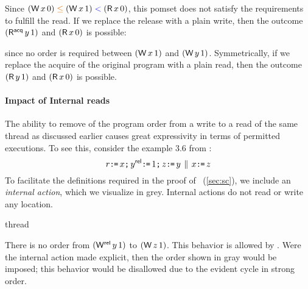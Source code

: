 \smallskip
\noindent
Since $(\DW x0) \gtN (\DW x1) \lt (\DR x0)$, this pomset does not satisfy the
requirements to fulfill the read.
If we replace the release
with a plain write, then the outcome $(\DRAcq y1)$ and $(\DR x0)$ is possible:
\begin{tikzdisplay}[node distance=1em]
\end{tikzdisplay}
since no order is required between $(\DW x1)$ and $(\DW y1)$.  
Symmetrically, if we replace the acquire of the original program
with a plain read, then the outcome $(\DR y1)$ and $(\DR x0)$ is possible.

\paragraph{Impact of Internal reads}
The ability to remove of the program order from a write to a read of the same thread as discussed earlier causes great expressivity in terms of permitted executions.  To see this, consider the example 3.6 from
\cite{DBLP:journals/pacmpl/PodkopaevLV19}:
\begin{displaymath}
  r\texttt{:}\mkern-1mu\texttt{=}\, x\texttt{;}\,
  y^{\mathsf{rel}}\texttt{:}\mkern-1mu\texttt{=}\, 1\texttt{;}\,
  z\texttt{:}\mkern-1mu\texttt{=}\, y
  \,\mathbin{\|}\,
  x\texttt{:}\mkern-1mu\texttt{=}\, z
\end{displaymath}
To facilitate the definitions required in the proof
of \drfsc\ (\textsection\ref{sec:sc}), we include an \emph{internal action},
which we visualize in grey.  Internal actions do not read or write any
location.  
\begin{tikzdisplaylabel}[node distance=1em]{thread}
\end{tikzdisplaylabel}
There is no order from $(\DWRel{y}{1})$ to $(\DW{z}{1})$.  This behavior is
allowed by \armeight.  Were the internal action made explicit, then the order
shown in gray would be imposed; this behavior would be disallowed due to the
evident cycle in strong order.


